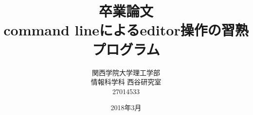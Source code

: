\title{卒業論文\\command lineによるeditor操作の習熟プログラム}
\author{関西学院大学理工学部\\情報科学科 西谷研究室\\27014533 }
\date{2018年3月}

\maketitle
\newpage
